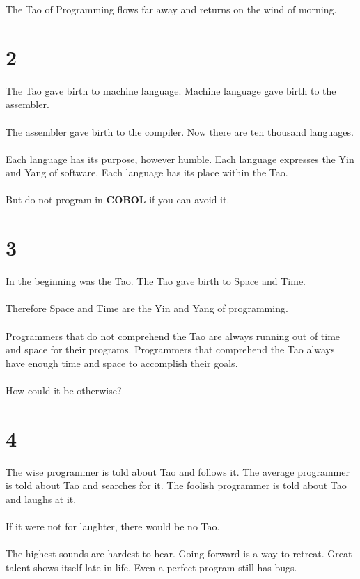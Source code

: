 \documentclass[14pt, letterpaper]{book}
\begin{document}
The Tao of Programming flows far away and returns on the wind of morning.

\section*{2}

The Tao gave birth to machine language. Machine language gave birth to the assembler. \\
\\
The assembler gave birth to the compiler. Now there are ten thousand languages.\\
\\
Each language has its purpose, however humble. Each language expresses the Yin and Yang of software. Each language has its place within the Tao.\\
\\
But do not program in \textbf{COBOL} if you can avoid it.

\section*{3}

In the beginning was the Tao. The Tao gave birth to Space and Time. \\
\\
Therefore Space and Time are the Yin and Yang of programming.\\
\\
Programmers that do not comprehend the Tao are always running out of time and space for their programs. Programmers that comprehend the Tao always have enough time and space to accomplish their goals.\\  
\\
How could it be otherwise?

\section*{4}

The wise programmer is told about Tao and follows it. The average programmer is told about Tao and searches for it. The foolish programmer is told about Tao and laughs at it.\\
\\
If it were not for laughter, there would be no Tao.\\
\\
The highest sounds are hardest to hear. Going forward is a way to retreat. Great talent shows itself late in life. Even a perfect program still has bugs.
\end{document}

